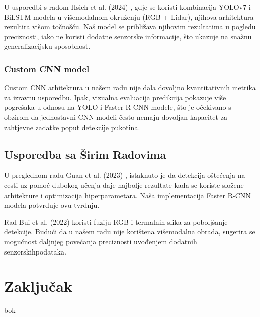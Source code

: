\documentclass[conference]{IEEEtran}
\begin{document}
U usporedbi s radom Hsieh et al. (2024) \cite{hsieh2024}, gdje se koristi kombinacija YOLOv7 i BiLSTM modela u višemodalnom okruženju (RGB + Lidar), njihova arhitektura rezultira višom točnošću. Naš model se približava njihovim rezultatima u pogledu preciznosti, iako ne koristi dodatne senzorske informacije, što ukazuje na snažnu generalizacijsku sposobnost.

\subsubsection*{Custom CNN model}

Custom CNN arhitektura u našem radu nije dala dovoljno kvantitativnih metrika za izravnu usporedbu. Ipak, vizualna evaluacija predikcija pokazuje više pogrešaka u odnosu na YOLO i Faster R-CNN modele, što je očekivano s obzirom da jednostavni CNN modeli često nemaju dovoljan kapacitet za zahtjevne zadatke poput detekcije pukotina.

\subsection{Usporedba sa Širim Radovima}

U preglednom radu Guan et al. (2023) \cite{guan2023}, istaknuto je da detekcija oštećenja na cesti uz pomoć dubokog učenja daje najbolje rezultate kada se koriste složene arhitekture i optimizacija hiperparametara. Naša implementacija Faster R-CNN modela potvrđuje ovu tvrdnju.

Rad Bui et al. (2022) \cite{mdpi2022} koristi fuziju RGB i termalnih slika za poboljšanje detekcije. Budući da u našem radu nije korištena višemodalna obrada, sugerira se mogućnost daljnjeg povećanja preciznosti uvođenjem dodatnih senzorskihpodataka.


\section{Zaključak}
\label{pog:zakljucak}

bok \cite{lau2020} \cite{tapamo2023} \cite{nafaa2024} \cite{mdpi2022} \cite{hsieh2024} \cite{guan2023}


\end{document}

